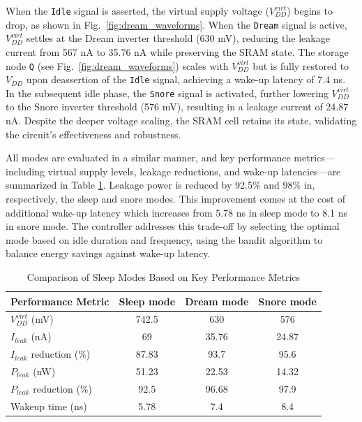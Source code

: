 \documentclass[conference]{IEEEtran}
\begin{document}
When the \texttt{Idle} signal is asserted, the virtual supply voltage ($V_{DD}^{virt}$) begins to drop, as shown in Fig.~\ref{fig:dream_waveforms}. When the \texttt{Dream} signal is active, $V_{DD}^{virt}$ settles at the Dream inverter threshold (630 mV), reducing the leakage current from 567 nA to 35.76 nA while preserving the SRAM state. The storage node \texttt{Q} (see Fig.~\ref{fig:dream_waveforms}) scales with $V_{DD}^{virt}$ but is fully restored to $V_{DD}$ upon deassertion of the \texttt{Idle} signal, achieving a wake-up latency of 7.4 ns. In the subsequent idle phase, the  \texttt{Snore} signal is activated, further lowering $V_{DD}^{virt}$ to the Snore inverter threshold (576 mV), resulting in a leakage current of 24.87 nA. Despite the deeper voltage scaling, the SRAM cell retains its state, validating the circuit's effectiveness and robustness.

All modes are evaluated in a similar manner, and key performance metrics---including virtual supply levels, leakage reductions, and wake-up latencies---are summarized in Table \ref{table:sleep_modes}. Leakage power is reduced by 92.5\% and 98\% in, respectively, the sleep and snore modes. This improvement comes at the cost of additional wake-up latency which increases from 5.78 ns in sleep mode to 8.1 ns in snore mode. The controller addresses this trade-off by selecting the optimal mode based on idle duration and frequency, using the bandit algorithm to balance energy savings against wake-up latency.

\begin{table}[h]
\centering
\caption{Comparison of Sleep Modes Based on Key Performance Metrics}
\label{table:sleep_modes}
\begin{tabular}{|>{\raggedright\arraybackslash}p{2.5cm}|c|c|c|}
\hline
\textbf{Performance Metric} & \textbf{Sleep mode} & \textbf{Dream mode} & \textbf{Snore mode} \\
\hline
$V_{DD}^{virt}$ (mV)            & 742.5   & 630   & 576 \\
\hline
$I_{leak}$ (nA)              & 69      & 35.76  & 24.87 \\
\hline
$I_{leak}$ reduction (\%)    & 87.83            & 93.7             & 95.6 \\
\hline
$P_{leak}$ (nW)                & 51.23   & 22.53   & 14.32 \\
\hline
$P_{leak}$ reduction (\%)      & 92.5             & 96.68            & 97.9 \\
\hline
Wakeup time (ns)                  & 5.78    & 7.4    & 8.4 \\
\hline
\end{tabular}
\end{table}
\end{document}
